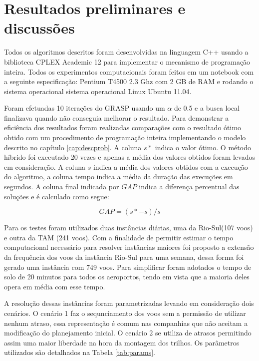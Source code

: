   \chapter{Resultados preliminares e discussões}


Todos os algoritmos descritos foram desenvolvidas na linguagem C++ usando a
biblioteca CPLEX Academic 12 para implementar o mecanismo de programação
inteira. Todos os experimentos computacionais foram feitos em um notebook com a
seguinte especificação: Pentium T4500 2.3 Ghz com 2 GB de RAM e rodando o
sistema operacional sistema operacional Linux Ubuntu 11.04.

Foram efetuadas 10 iterações do GRASP usando um $\alpha$ de 0.5 e a busca local
finalizava quando não conseguia melhorar o resultado. Para demonstrar a
eficiência dos resultados foram realizadas comparações com o resultado ótimo
obtido com um procedimento de programação inteira implementando o modelo
descrito no capítulo \ref{cap:descprob}. A coluna $s*$ indica o valor ótimo. O
método híbrido foi executado 20 vezes e apenas a média dos valores obtidos
foram levados em consideração. A coluna $s$ indica a média dos valores obtidos
com a execução do algoritmo, a coluna tempo indica a média da duração das
execuções em segundos. A coluna final indicada por $GAP$ indica a diferença
percentual das soluções e é calculado como segue:

\[  GAP = (s* - s)/s \]

Para os testes foram utilizados duas instâncias diárias, uma da Rio-Sul(107
voos) e outra da TAM (241 voos).  Com a finalidade de permitir estimar o tempo
computacional necessário para resolver instâncias maiores foi proposto a
extensão da frequência dos voos da instância Rio-Sul para uma semana, dessa
forma foi gerado uma instância com 749 voos. Para simplificar foram adotados o
tempo de solo de 20 minutos para todos os aeroportos, tendo em vista que a
maioria deles opera em média com esse tempo.

A resolução dessas instâncias foram parametrizadas levando em consideração dois
cenários. O cenário 1 faz o sequnciamento dos voos sem a permissão de utilizar
nenhum atraso, essa representação é comum nas companhias que não aceitam a
modificação do planejamento inicial. O cenário 2 se utiliza de atrasos
permitindo assim uma maior liberdade na hora da montagem dos trilhos. Os
parâmetros utilizados são detalhados na Tabela \ref{tab:params}.


